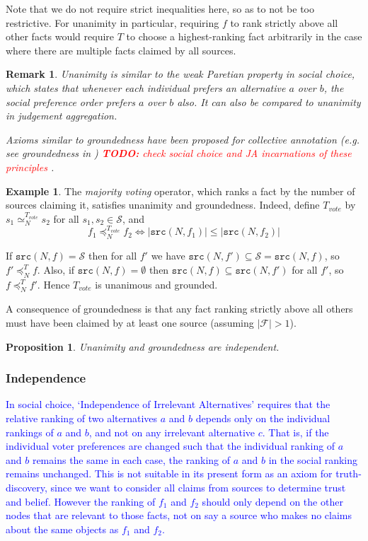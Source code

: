 \documentclass{article}
\theoremstyle{definition} \newtheorem{definition}{Definition}
\theoremstyle{definition} \newtheorem{example}{Example}
\theoremstyle{plain} \newtheorem{axiom}{Axiom}
\theoremstyle{plain} \newtheorem*{remark}{Remark}
\theoremstyle{remark} \newtheorem*{notation}{Notation}
\theoremstyle{plain} \newtheorem{lemma}{Lemma}
\theoremstyle{plain} \newtheorem{theorem}{Theorem}
\theoremstyle{plain} \newtheorem{proposition}{Proposition}
\newcommand{\todo}[1] {
    \textcolor{red}{
        \textbf{TODO:} #1
    }
}
\newcommand{\rough}[1] {
    \textcolor{blue}{
        #1
    }
}
\renewcommand{\S}{\mathcal{S}}  %
\newcommand{\F}{\mathcal{F}}
\newcommand{\seq}{\simeq}
\newcommand{\fle}{\preceq}
\newcommand{\src}{\texttt{src}}
\begin{document}
Note that we do not require strict inequalities here, so as to not be too
restrictive. For unanimity in particular, requiring $f$ to rank strictly above
all other facts would require $T$ to choose a highest-ranking fact arbitrarily
in the case where there are multiple facts claimed by all sources.

\begin{remark}
Unanimity is similar to the \emph{weak Paretian}
property\cite{create_the_citation...} in social choice, which states that
whenever each individual prefers an alternative $a$ over $b$, the social
preference order prefers $a$ over $b$ also. It can also be compared to
unanimity in judgement aggregation\cite{handbook_ja}.

Axioms similar to groundedness have been proposed for collective annotation
(e.g. see \emph{groundedness} in \cite{kruger}) \todo{check social choice and
JA incarnations of these principles}.
\end{remark}

\begin{example}
The \emph{majority voting} operator, which ranks a fact by the number of
sources claiming it, satisfies unanimity and groundedness. Indeed, define
$T_{vote}$ by $s_1 \seq_N^{T_{vote}} s_2$ for all $s_1, s_2 \in \S$, and
    $$ f_1 \fle_N^{T_{vote}} f_2 \iff |\src(N, f_1)| \le |\src(N, f_2)| $$

If $\src(N, f) = \S$ then for all $f'$ we have $\src(N, f') \subseteq \S =
\src(N, f)$, so $f' \fle_N^T f$. Also, if $\src(N, f) = \emptyset$ then
$\src(N, f) \subseteq \src(N, f')$ for all $f'$, so $f \fle_N^T f'$. Hence
$T_{vote}$ is unanimous and grounded.
\end{example}

A consequence of groundedness is that any fact ranking strictly above all
others must have been claimed by at least one source (assuming $|\F|>1$).

\begin{proposition}
\label{prop:unam_ground_indep}
Unanimity and groundedness are independent.
\end{proposition}

\subsubsection{Independence}

\rough{
    In social choice, `Independence of Irrelevant Alternatives' requires that
    the relative ranking of two alternatives $a$ and $b$ depends only on the
    individual rankings of $a$ and $b$, and not on any irrelevant alternative
    $c$. That is, if the individual voter preferences are changed such that the
    individual ranking of $a$ and $b$ remains the same in each case, the
    ranking of $a$ and $b$ in the social ranking remains unchanged.
    This is not suitable in its present form as an axiom for truth-discovery,
    since we want to consider all claims from sources to determine trust and
    belief. However the ranking of $f_1$ and $f_2$ should only depend on the
    other nodes that are relevant to those facts, not on say a source who makes
    no claims about the same objects as $f_1$ and $f_2$.
}
\end{document}

